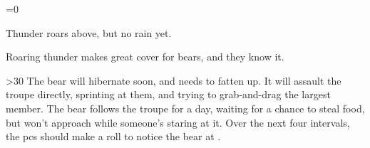 \ifnum\value{cycle}=0

\begin{boxtext}
  Thunder roars above, but no rain yet.
\end{boxtext}

Roaring thunder makes great cover for bears, and they know it.

\bear

\ifnum\value{fenestraDay}>30
  The bear will hibernate soon, and needs to fatten up.
  It will assault the troupe directly, sprinting at them, and trying to grab-and-drag the largest member.
\else
  The bear follows the troupe for a day, waiting for a chance to steal food, but won't approach while someone's staring at it.
  Over the next four \glspl{interval}, the \glspl{pc} should make a  roll to notice the bear at
  \tn.
\fi

\fi

